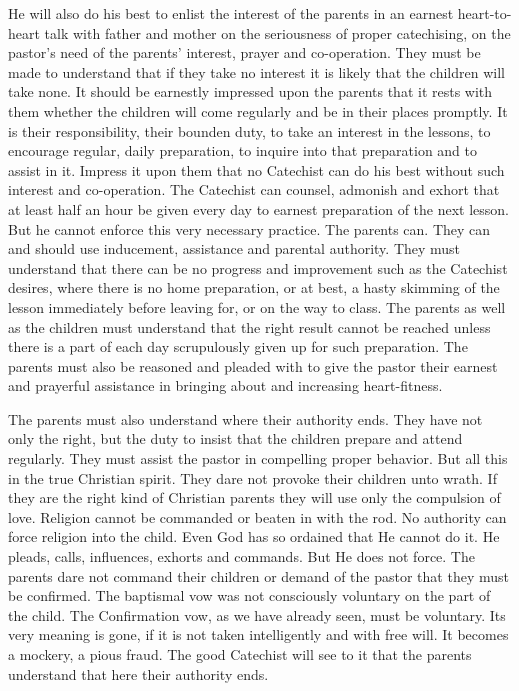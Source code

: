  He will also do his best to enlist the interest of the parents in an earnest heart-to-heart talk with father and mother on the seriousness of proper catechising, on the pastor’s need of the parents’ interest, prayer and co-operation. They must be made to understand that if they take no interest it is likely that the children will take none. It should be earnestly impressed upon the parents that it rests with them whether the children will come regularly and be in their places promptly. It is their responsibility, their bounden duty, to take an interest in the lessons, to encourage regular, daily preparation, to inquire into that preparation and to assist in it. Impress it upon them that no Catechist can do his best without such interest and co-operation. The Catechist can counsel, admonish and exhort that at least half an hour be given every day to earnest preparation of
the next lesson. But he cannot enforce this very necessary practice. The parents can. They can and should use inducement, assistance and parental authority. They must understand that there can be no progress and improvement such as the Catechist desires, where there is no home preparation, or at best, a hasty skimming of the lesson immediately before leaving for, or on the way to class. The parents as well as the children must understand that the right result cannot be reached unless there is a part of each day scrupulously given up for such preparation. The parents must also be reasoned and pleaded with to give the pastor their earnest and prayerful assistance in bringing about and increasing heart-fitness.

 The parents must also understand where their authority ends. They have not only the right, but the duty to insist that the children prepare and attend regularly. They must assist the pastor in compelling proper behavior. But all this in the true Christian spirit. They dare not provoke their children unto wrath. If they are the right kind of Christian parents they will use only the compulsion of love. Religion cannot be commanded or beaten in with the rod. No authority can force religion into the child. Even God has so ordained that He cannot do it. He pleads, calls, influences, exhorts and commands. But He does not force. The parents dare
not command their children or demand of the pastor that they must be confirmed. The baptismal vow was not consciously voluntary on the part of the child. The Confirmation vow, as we have already seen, must be voluntary. Its very meaning is gone, if it is not taken intelligently and with free will. It becomes a mockery, a pious fraud. The good Catechist will see to it that the parents understand that here their authority ends.

